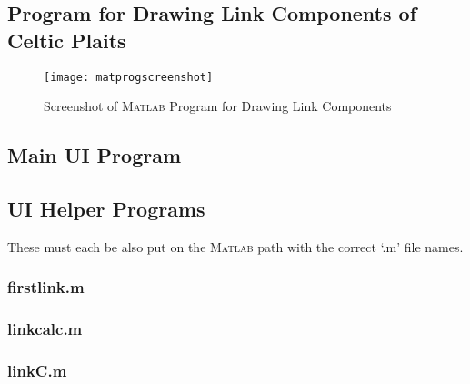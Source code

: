 \documentclass[10pt,a4paper]{report}
\theoremstyle{definition}
\theoremstyle{remark}
\theoremstyle{example}
\begin{document}
 
  
 \begin{appendices}
 \section{Program for Drawing Link Components of Celtic Plaits} \label{app:matpro}
 
\begin{figure}[H]
\centering
\graphicspath{{/Users/Imogen/Desktop/seifertimages/lapath/}}
\texttt{[image: matprogscreenshot]}
\caption{Screenshot of \textsc{Matlab} Program for Drawing Link Components}
\label{matprogscreenshot}
\end{figure} 

\subsection{Main UI Program}
 
 \subsection{UI Helper Programs}
 These must each be also put on the \textsc{Matlab} path with the correct `.m' file names.
 \subsubsection{firstlink.m}
  
  \subsubsection{linkcalc.m}
   
   \subsubsection{linkC.m}
    
 

\end{appendices}
\end{document}
